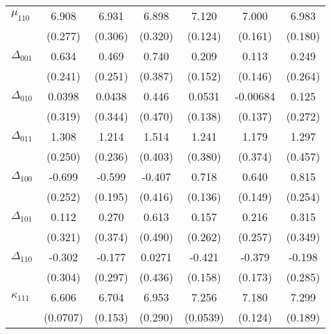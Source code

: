 \begin{table}[htbp]
\begin{tabular}{l*{6}{c}}
$\mu_{110}$&    6.908\sym{***}&    6.931\sym{***}&    6.898\sym{***}&    7.120\sym{***}&    7.000\sym{***}&    6.983\sym{***}\\
          &  (0.277)         &  (0.306)         &  (0.320)         &  (0.124)         &  (0.161)         &  (0.180)         \\
$\Delta_{001}$&    0.634\sym{***}&    0.469\sym{*}  &    0.740\sym{*}  &    0.209         &    0.113         &    0.249         \\
          &  (0.241)         &  (0.251)         &  (0.387)         &  (0.152)         &  (0.146)         &  (0.264)         \\
$\Delta_{010}$&   0.0398         &   0.0438         &    0.446         &   0.0531         & -0.00684         &    0.125         \\
          &  (0.319)         &  (0.344)         &  (0.470)         &  (0.138)         &  (0.137)         &  (0.272)         \\
$\Delta_{011}$&    1.308\sym{***}&    1.214\sym{***}&    1.514\sym{***}&    1.241\sym{***}&    1.179\sym{***}&    1.297\sym{***}\\
          &  (0.250)         &  (0.236)         &  (0.403)         &  (0.380)         &  (0.374)         &  (0.457)         \\
$\Delta_{100}$&   -0.699\sym{***}&   -0.599\sym{***}&   -0.407         &    0.718\sym{***}&    0.640\sym{***}&    0.815\sym{***}\\
          &  (0.252)         &  (0.195)         &  (0.416)         &  (0.136)         &  (0.149)         &  (0.254)         \\
$\Delta_{101}$&    0.112         &    0.270         &    0.613         &    0.157         &    0.216         &    0.315         \\
          &  (0.321)         &  (0.374)         &  (0.490)         &  (0.262)         &  (0.257)         &  (0.349)         \\
$\Delta_{110}$&   -0.302         &   -0.177         &   0.0271         &   -0.421\sym{***}&   -0.379\sym{**} &   -0.198         \\
          &  (0.304)         &  (0.297)         &  (0.436)         &  (0.158)         &  (0.173)         &  (0.285)         \\
$\kappa_{111}$&    6.606\sym{***}&    6.704\sym{***}&    6.953\sym{***}&    7.256\sym{***}&    7.180\sym{***}&    7.299\sym{***}\\
          & (0.0707)         &  (0.153)         &  (0.290)         & (0.0539)         &  (0.124)         &  (0.189)         \\

\end{tabular}
\end{table}
